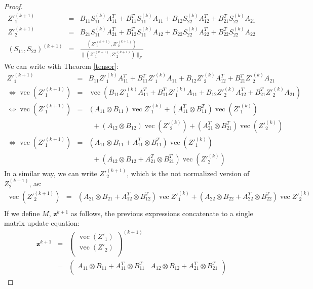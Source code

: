 \documentclass[a4paper,11pt]{report}
\newcommand{\vect}{\operatorname{vec}}
\begin{document}
\begin{proof}
\begin{eqnarray*}
  Z'^{(k+1)}_1 &=& B_{11}S^{(k)}_{11}A_{11}^T + B^T_{11}S^{(k)}_{11}A_{11} + B_{12}S^{(k)}_{22}A_{12}^T + B^T_{21}S^{(k)}_{22}A_{21}\\
  Z'^{(k+1)}_2 &=& B_{21}S^{(k)}_{11}A_{21}^T + B^T_{12}S^{(k)}_{11}A_{12} + B_{22}S^{(k)}_{22}A_{22}^T + B^T_{22}S^{(k)}_{22}A_{22} \\
 (S_{11}, S_{22})^{(k+1)} &=& \frac{(Z'^{(k+1)}_1, Z'^{(k+1)}_2)}{\|(Z'^{(k+1)}_1, Z'^{(k+1)}_2)\|_F}
 \end{eqnarray*}
We can write with Theorem \ref{tensor}:
\begin{eqnarray*}
  Z'^{(k+1)}_1 &=& B_{11}Z'^{(k)}_1A_{11}^T + B^T_{11}Z'^{(k)}_1A_{11} + B_{12}Z'^{(k)}_2A_{12}^T + B^T_{21}Z'^{(k)}_{2}A_{21}\\
 \Leftrightarrow \vect(Z'^{(k+1)}_1) &=& \vect(B_{11}Z'^{(k)}_1A_{11}^T + B^T_{11}Z'^{(k)}_1A_{11} + B_{12}Z'^{(k)}_2A_{12}^T + B^T_{21}Z'^{(k)}_{2}A_{21})\\
  \Leftrightarrow \vect(Z'^{(k+1)}_1) &=& (A_{11}\otimes B_{11})\vect{Z'^{(k)}_1}  
  + (A^T_{11}\otimes B^T_{11})\vect(Z'^{(k)}_1) \\
  && \;\; + (A_{12}\otimes B_{12})\vect(Z'^{(k)}_2)
  + (A^T_{21}\otimes B^T_{21})\vect(Z'^{(k)}_2) \\
  \Leftrightarrow \vect(Z'^{(k+1)}_1) &=& (A_{11}\otimes B_{11} + A^T_{11}\otimes B^T_{11})\vect(Z'^{(k)}_1)  \\ 
&&  \;\; + (A_{12}\otimes B_{12}+A^T_{21}\otimes B^T_{21})\vect(Z'^{(k)}_2)
 \end{eqnarray*}
 In a similar way, we can write $Z'^{(k+1)}_2$, which is the not normalized version of $Z^{(k+1)}_2$, as:
 \begin{eqnarray*}
 \vect(Z'^{(k+1)}_2) &=& (A_{21}\otimes B_{21} + A^T_{12}\otimes B^T_{12})\vect{Z'^{(k)}_1} + (A_{22}\otimes B_{22}+A^T_{22}\otimes B^T_{22})\vect{Z'^{(k)}_2}\\
\end{eqnarray*}
If we define $M$, $\mathbf{z}^{k+1}$ as follows, the previous expressions 
concatenate to a single matrix update equation:
\begin{eqnarray*}
\mathbf{z}^{k+1} &=& \begin{pmatrix}
\vect(Z'_1)\\
\vect(Z'_2)\\
\end{pmatrix}^{(k+1)}\\
&=& \begin{pmatrix}
A_{11}\otimes B_{11} + A^T_{11}\otimes B^T_{11}& A_{12}\otimes B_{12}+A^T_{21}\otimes B^T_{21}\\

\end{pmatrix}
\end{eqnarray*}
\end{proof}
\end{document}
